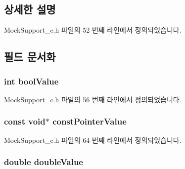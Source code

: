 \subsection{상세한 설명}


Mock\+Support\+\_\+c.\+h 파일의 52 번째 라인에서 정의되었습니다.



\subsection{필드 문서화}
\subsubsection[{\texorpdfstring{bool\+Value}{boolValue}}]{\setlength{\rightskip}{0pt plus 5cm}int bool\+Value}\hypertarget{struct_s_mock_value__c_a22ded2e46e47857bd6eb5778576a326a}{}\label{struct_s_mock_value__c_a22ded2e46e47857bd6eb5778576a326a}


Mock\+Support\+\_\+c.\+h 파일의 56 번째 라인에서 정의되었습니다.

\subsubsection[{\texorpdfstring{const\+Pointer\+Value}{constPointerValue}}]{\setlength{\rightskip}{0pt plus 5cm}const void$\ast$ const\+Pointer\+Value}\hypertarget{struct_s_mock_value__c_acc3a4d41d629789321124f6d156241a2}{}\label{struct_s_mock_value__c_acc3a4d41d629789321124f6d156241a2}


Mock\+Support\+\_\+c.\+h 파일의 64 번째 라인에서 정의되었습니다.

\subsubsection[{\texorpdfstring{double\+Value}{doubleValue}}]{\setlength{\rightskip}{0pt plus 5cm}double double\+Value}\hypertarget{struct_s_mock_value__c_a7bc845542bdc79ff87d50b7c40a069f2}{}\label{struct_s_mock_value__c_a7bc845542bdc79ff87d50b7c40a069f2}


